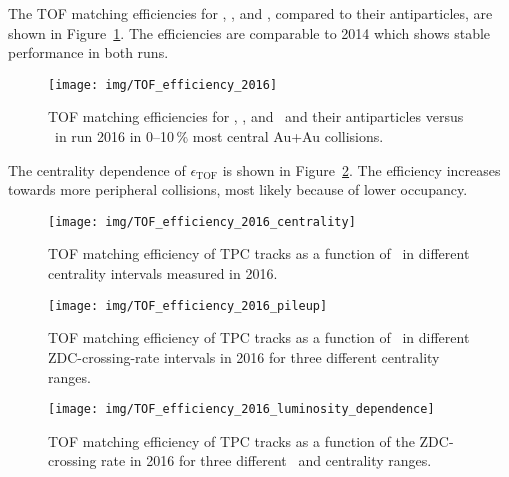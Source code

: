 The TOF matching efficiencies for \piplus, \Kplus, and \pplus, compared to their antiparticles, are shown in Figure~\ref{tof2016}. The efficiencies are comparable to 2014 which shows stable performance in both runs.

\begin{figure}[!htb]
\centering
\texttt{[image: img/TOF\_efficiency\_2016]}
\caption[TOF matching efficiencies for \piplus, \Kplus, and \pplus\ and their antiparticles in run 2016.]{\label{tof2016} TOF matching efficiencies for \piplus, \Kplus, and \pplus\ and their antiparticles versus \pt\ in run 2016 in 0--10$\,\%$ most central Au+Au collisions.}
\end{figure}

The centrality dependence of $\epsilon_\mathrm{TOF}$ is shown in Figure~\ref{tof2016centrality}\@. The efficiency increases towards more peripheral collisions, most likely because of lower occupancy. 

\begin{figure}[!htb]
\centering
\texttt{[image: img/TOF\_efficiency\_2016\_centrality]}
\caption[TOF matching efficiency of TPC tracks as a function of \pt\ in different centrality intervals measured in 2016.]{\label{tof2016centrality} TOF matching efficiency of TPC tracks as a function of \pt\ in different centrality intervals measured in 2016\@.}
\end{figure}

\begin{figure}[!htb]
\centering
\texttt{[image: img/TOF\_efficiency\_2016\_pileup]}
\caption[TOF matching efficiency of TPC tracks as a function of \pt\ in different ZDC-crossing-rate intervals in 2016.]{\label{tof2016pileup} TOF matching efficiency of TPC tracks as a function of \pt\ in different ZDC-crossing-rate intervals in 2016 for three different centrality ranges.}
\end{figure}

\begin{figure}[!htb]
\centering
\texttt{[image: img/TOF\_efficiency\_2016\_luminosity\_dependence]}
\caption[TOF matching efficiency of TPC tracks as a function of the ZDC-crossing rate in 2016.]{\label{tof2016lumiDependence} TOF matching efficiency of TPC tracks as a function of the ZDC-crossing rate in 2016 for three different \pt\ and centrality ranges.}
\end{figure}

